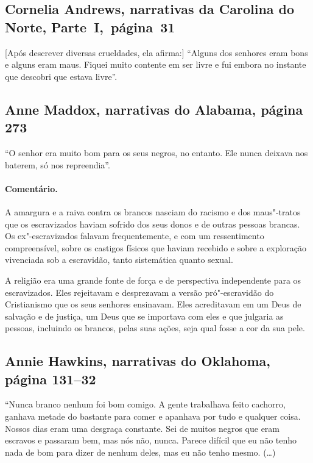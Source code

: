 \subsection{Cornelia Andrews, narrativas da Carolina do Norte, Parte~I,~página~31} \label{ref09}

{[}Após descrever diversas crueldades, ela afirma:{]} ``Alguns dos
senhores eram bons e alguns eram maus. Fiquei muito contente em ser
livre e fui embora no instante que descobri que estava livre''.

\subsection{Anne Maddox, narrativas do Alabama, página 273}
\label{ref180}

``O senhor era muito bom para os seus negros, no entanto. Ele nunca
deixava nos baterem, só nos repreendia''.

\paragraph{Comentário.}\quad
{\small
A amargura e a raiva contra os brancos nasciam do racismo e dos
maus"-tratos que os escravizados haviam sofrido dos seus donos e de outras
pessoas brancas. Os ex"-escravizados falavam frequentemente, e com um
ressentimento compreensível, sobre os castigos físicos que haviam
recebido e sobre a exploração vivenciada sob a escravidão, tanto
sistemática quanto sexual.

A religião era uma grande fonte de força e de perspectiva
independente para os escravizados. Eles rejeitavam e desprezavam a versão
pró"-escravidão do Cristianismo que os seus senhores ensinavam. Eles
acreditavam em um Deus de salvação e de justiça, um Deus que se
importava com eles e que julgaria as pessoas, incluindo os brancos,
pelas suas ações, seja qual fosse a cor da sua pele.
}

\subsection{Annie Hawkins, narrativas do Oklahoma, página 131--32} \label{ref123}

``Nunca branco nenhum foi bom comigo. A gente trabalhava feito cachorro,
ganhava metade do bastante para comer e apanhava por tudo e qualquer
coisa. Nossos dias eram uma desgraça constante. Sei de muitos negros que
eram escravos e passaram bem, mas nós não, nunca. Parece difícil que eu
não tenho nada de bom para dizer de nenhum deles, mas eu não tenho
mesmo. (\ldots{})

